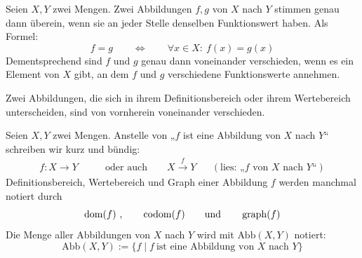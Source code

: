 \begin{axiom} \label{abbgleich}
    Seien $X,Y$ zwei Mengen. Zwei Abbildungen $f,g$ von $X$ nach $Y$ stimmen genau dann überein, wenn sie an jeder Stelle denselben Funktionswert haben. Als Formel:
        \[ f=g \qquad\Leftrightarrow\qquad \forall x\in X:\ f(x)=g(x) \]
    Dementsprechend sind $f$ und $g$ genau dann voneinander verschieden, wenn es ein Element von $X$ gibt, an dem $f$ und $g$ verschiedene Funktionswerte annehmen.
    
    Zwei Abbildungen, die sich in ihrem Definitionsbereich oder ihrem Wertebereich unterscheiden, sind von vornherein voneinander verschieden.
\end{axiom}


\begin{nota}
    Seien $X,Y$ zwei Mengen.
    Anstelle von „$f$ ist eine Abbildung von $X$ nach $Y$“ schreiben wir kurz und bündig:
    \begin{align*}
        f:X \to Y \qquad & \text{oder auch}\qquad X\xrightarrow{f} Y && (\text{lies: „$f$ von $X$ nach $Y$“})
    \end{align*}
    Definitionsbereich, Wertebereich und Graph einer Abbildung $f$ werden manchmal notiert durch
        \[ \operatorname{dom}(f)\ , \qquad \operatorname{codom}(f) \qquad\text{und}\qquad \operatorname{graph}(f)\]
    Die Menge aller Abbildungen von $X$ nach $Y$ wird mit $\text{Abb}(X,Y)$ notiert:
        \[ \text{Abb}(X,Y) := \{ f \mid f\ \text{ist eine Abbildung von $X$ nach $Y$} \} \]
\end{nota}


